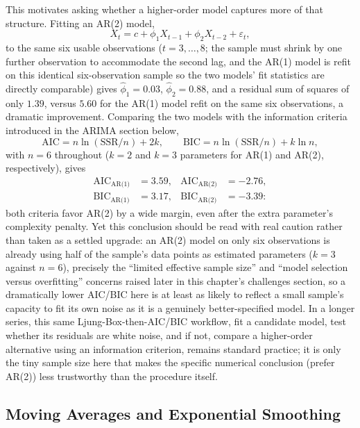 \documentclass[../ai_in_finance]{subfiles}
\begin{document}
This motivates asking whether a higher-order model captures more of that structure. Fitting an AR(2) model,
$$X_t = c + \phi_1 X_{t-1} + \phi_2 X_{t-2} + \varepsilon_t,$$
to the same six usable observations ($t=3,\ldots,8$; the sample must shrink by one further observation to accommodate the second lag, and the AR(1) model is refit on this identical six-observation sample so the two models' fit statistics are directly comparable) gives $\hat\phi_1 = 0.03$, $\hat\phi_2 = 0.88$, and a residual sum of squares of only $1.39$, versus $5.60$ for the AR(1) model refit on the same six observations, a dramatic improvement. Comparing the two models with the information criteria introduced in the ARIMA section below,
\begin{equation*}
\text{AIC} = n\ln(\text{SSR}/n) + 2k, \qquad \text{BIC} = n\ln(\text{SSR}/n) + k\ln n,
\end{equation*}
with $n=6$ throughout ($k=2$ and $k=3$ parameters for AR(1) and AR(2), respectively), gives
\begin{align*}
\text{AIC}_{\text{AR(1)}} &= 3.59, & \text{AIC}_{\text{AR(2)}} &= -2.76, \\
\text{BIC}_{\text{AR(1)}} &= 3.17, & \text{BIC}_{\text{AR(2)}} &= -3.39:
\end{align*}
both criteria favor AR(2) by a wide margin, even after the extra parameter's complexity penalty.
Yet this conclusion should be read with real caution rather than taken as a settled upgrade: an AR(2) model on only six observations is already using half of the sample's data points as estimated parameters ($k=3$ against $n=6$), precisely the ``limited effective sample size'' and ``model selection versus overfitting'' concerns raised later in this chapter's challenges section, so a dramatically lower AIC/BIC here is at least as likely to reflect a small sample's capacity to fit its own noise as it is a genuinely better-specified model. In a longer series, this same Ljung-Box-then-AIC/BIC workflow, fit a candidate model, test whether its residuals are white noise, and if not, compare a higher-order alternative using an information criterion, remains standard practice; it is only the tiny sample size here that makes the specific numerical conclusion (prefer AR(2)) less trustworthy than the procedure itself.

\subsection{Moving Averages and Exponential Smoothing}
\end{document}
